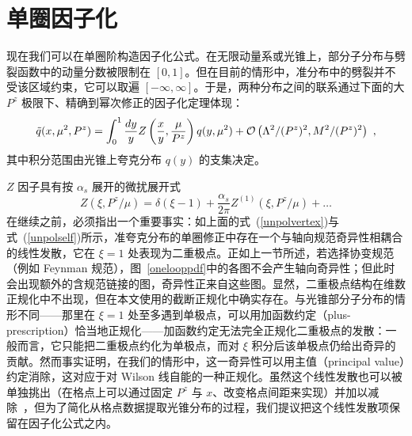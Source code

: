 \section{单圈因子化}

现在我们可以在单圈阶构造因子化公式。在无限动量系或光锥上，部分子分布与劈裂函数中的动量分数被限制在 $[0,1]$。但在目前的情形中，准分布中的劈裂并不受该区域约束，它可以取遍 $[-\infty,\infty]$。于是，两种分布之间的联系通过下面的大 $P^z$ 极限下、精确到幂次修正的因子化定理体现：
\begin{equation}
    \tilde q(x, \mu^2, P^z)  = \int^1_{0} \frac{dy}{y} Z\left(\frac{x}{y},\frac{\mu}{P^z}\right) q(y, \mu^2) +  {\cal O}\left(\Lambda^2/(P^z)^2,  M^2/(P^z)^2\right)\ ,
\end{equation}
其中积分范围由光锥上夸克分布 $q(y)$ 的支集决定。

$Z$ 因子具有按 $\alpha_s$ 展开的微扰展开式
\begin{equation}
             Z(\xi, P^z/\mu) = \delta (\xi-1) + \frac{\alpha_s}{2\pi} Z^{(1)}(\xi, P^z/\mu) + \dots
\end{equation}
在继续之前，必须指出一个重要事实：如上面的式~(\ref{unpolvertex})与式~(\ref{unpolself})所示，准夸克分布的单圈修正中存在一个与轴向规范奇异性相耦合的线性发散，它在 $\xi=1$ 处表现为二重极点。正如上一节所述，若选择协变规范（例如 Feynman 规范），图~\ref{onelooppdf}中的各图不会产生轴向奇异性；但此时会出现额外的含规范链接的图，奇异性正来自这些图。显然，二重极点结构在维数正规化中不出现，但在本文使用的截断正规化中确实存在。与光锥部分子分布的情形不同——那里在 $\xi=1$ 处至多遇到单极点，可以用加函数约定（plus-prescription）恰当地正规化——加函数约定无法完全正规化二重极点的发散：一般而言，它只能把二重极点约化为单极点，而对 $\xi$ 积分后该单极点仍给出奇异的贡献。然而事实证明，在我们的情形中，这一奇异性可以用主值（principal value）约定消除，这对应于对 Wilson 线自能的一种正规化。虽然这个线性发散也可以被单独挑出（在格点上可以通过固定 $P^z$ 与 $x$、改变格点间距来实现）并加以减除~\cite{footnote1}，但为了简化从格点数据提取光锥分布的过程，我们提议把这个线性发散项保留在因子化公式之内。

